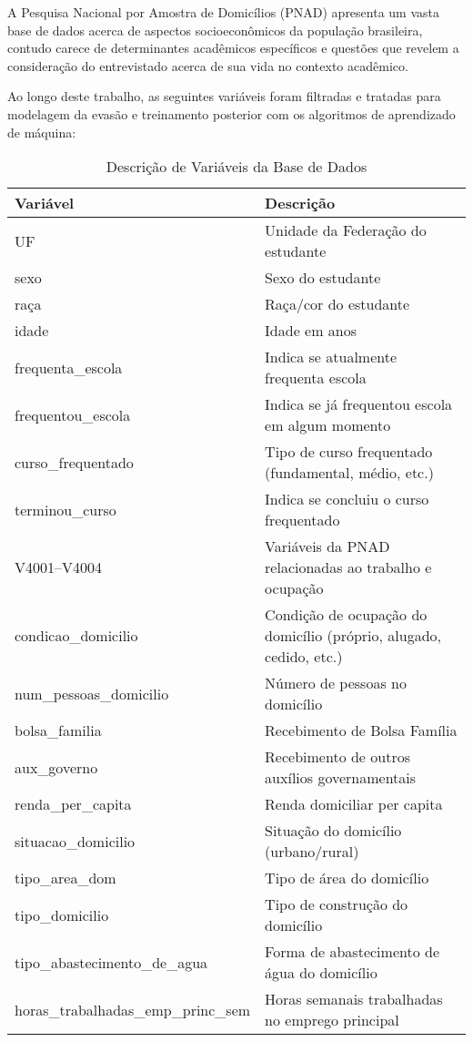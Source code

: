 \documentclass[english, spanish, brazilian]{RBIEarticle} %
\begin{document}
A Pesquisa Nacional por Amostra de Domicílios (PNAD) apresenta um vasta base de dados acerca de aspectos socioeconômicos da população brasileira, contudo carece de determinantes acadêmicos específicos e questões que revelem a consideração do entrevistado acerca de sua vida no contexto acadêmico. 

Ao longo deste trabalho, as seguintes variáveis foram filtradas e tratadas para modelagem da evasão e treinamento posterior com os algoritmos de aprendizado de máquina:


\begin{table}
\caption{Descrição de Variáveis da Base de Dados}
\centering
\label{tab:variables}
\begin{tabular}{lp{8cm}}
\hline
Variável & Descrição \\ \hline
UF & Unidade da Federação do estudante \\
sexo & Sexo do estudante \\
raça & Raça/cor do estudante \\
idade & Idade em anos \\
frequenta\_escola & Indica se atualmente frequenta escola \\
frequentou\_escola & Indica se já frequentou escola em algum momento \\
curso\_frequentado & Tipo de curso frequentado (fundamental, médio, etc.) \\
terminou\_curso & Indica se concluiu o curso frequentado \\
V4001--V4004 & Variáveis da PNAD relacionadas ao trabalho e ocupação \\
condicao\_domicilio & Condição de ocupação do domicílio (próprio, alugado, cedido, etc.) \\
num\_pessoas\_domicilio & Número de pessoas no domicílio \\
bolsa\_familia & Recebimento de Bolsa Família \\
aux\_governo & Recebimento de outros auxílios governamentais \\
renda\_per\_capita & Renda domiciliar per capita \\
situacao\_domicilio & Situação do domicílio (urbano/rural) \\
tipo\_area\_dom & Tipo de área do domicílio \\
tipo\_domicilio & Tipo de construção do domicílio \\
tipo\_abastecimento\_de\_agua & Forma de abastecimento de água do domicílio \\
horas\_trabalhadas\_emp\_princ\_sem & Horas semanais trabalhadas no emprego principal \\

\end{tabular}
\end{table}
\end{document}
